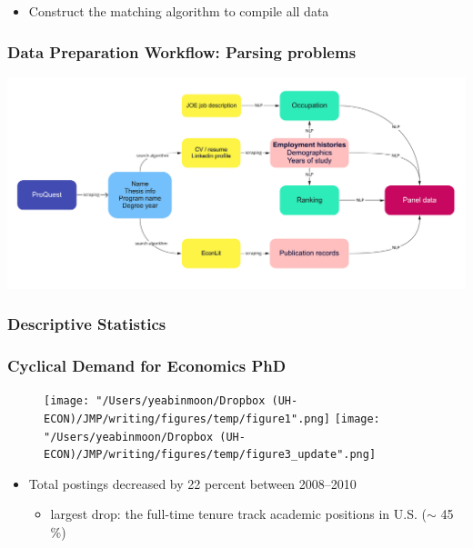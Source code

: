 \documentclass[10pt,svgnames,fragile]{beamer}
\begin{document}
{\begin{frame}[label=Data]
\begin{itemize}
\vfill
			\item Construct the matching algorithm to compile all data %
\vfill
		\end{itemize}
	\end{frame}

\begin{frame}
	\frametitle{Data Preparation Workflow: Parsing problems}
	\includegraphics[width=\linewidth]{pic_flow.jpg}
\end{frame}

\begin{frame}
		\frametitle{Descriptive Statistics}
		
	\end{frame}


\begin{frame}
	\frametitle{Cyclical Demand for Economics PhD}
	
	\begin{figure}
		\centering
		\texttt{[image: "/Users/yeabinmoon/Dropbox (UH-ECON)/JMP/writing/figures/temp/figure1".png]} 
		\texttt{[image: "/Users/yeabinmoon/Dropbox (UH-ECON)/JMP/writing/figures/temp/figure3\_update".png]} 
	\end{figure}
	

	\begin{itemize}	
		\item Total postings decreased by 22 percent between 2008--2010
		\vspace{2 mm}
		\begin{itemize}
			\item largest drop: the full-time tenure track academic positions in U.S. ($\sim$ 45 \%)
		\end{itemize}
	\end{itemize}
\end{frame}
}
\end{document}
